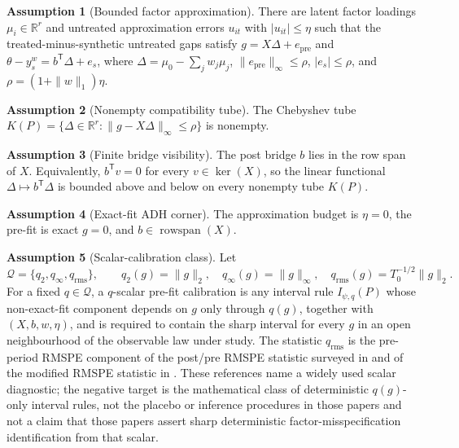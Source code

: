 \documentclass[11pt]{article}
\newcommand{\transpose}{\mathsf{T}}
\newcommand{\R}{\mathbb{R}}
\theoremstyle{definition}
\newtheorem{assumption}{Assumption}
\theoremstyle{plain}
\theoremstyle{remark}
\begin{document}
\begin{assumption}[Bounded factor approximation]\label{ass:bounded-factor}
There are latent factor loadings \(\mu_i\in\R^r\) and untreated approximation
errors \(u_{it}\) with \(|u_{it}|\le\eta\) such that the treated-minus-synthetic
untreated gaps satisfy \(g=X\Delta+e_{\mathrm{pre}}\) and
\(\theta-y_s^w=b^\transpose\Delta+e_s\), where
\(\Delta=\mu_0-\sum_jw_j\mu_j\), \(\|e_{\mathrm{pre}}\|_\infty\le\rho\),
\(|e_s|\le\rho\), and \(\rho=(1+\|w\|_1)\eta\).
\end{assumption}

\begin{assumption}[Nonempty compatibility tube]\label{ass:nonempty}
The Chebyshev tube \(K(P)=\{\Delta\in\R^r:\|g-X\Delta\|_\infty\le\rho\}\) is
nonempty.
\end{assumption}

\begin{assumption}[Finite bridge visibility]\label{ass:bridge-visible}
The post bridge \(b\) lies in the row span of \(X\).  Equivalently,
\(b^\transpose v=0\) for every \(v\in\ker(X)\), so the linear functional
\(\Delta\mapsto b^\transpose\Delta\) is bounded above and below on every
nonempty tube \(K(P)\).
\end{assumption}

\begin{assumption}[Exact-fit ADH corner]\label{ass:exact-corner}
The approximation budget is \(\eta=0\), the pre-fit is exact \(g=0\), and
\(b\in\operatorname{rowspan}(X)\).
\end{assumption}

\begin{assumption}[Scalar-calibration class]\label{ass:scalar-class}
Let
\[
 \mathcal Q=\{q_2,q_\infty,q_{\mathrm{rms}}\},\qquad
 q_2(g)=\|g\|_2,\quad q_\infty(g)=\|g\|_\infty,\quad
 q_{\mathrm{rms}}(g)=T_0^{-1/2}\|g\|_2 .
\]
For a fixed \(q\in\mathcal Q\), a \(q\)-scalar pre-fit calibration is any
interval rule \(I_{\psi,q}(P)\) whose non-exact-fit component depends on \(g\)
only through \(q(g)\), together with \((X,b,w,\eta)\), and is required to
contain the sharp interval for every \(g\) in an open neighbourhood of the
observable law under study.  The statistic \(q_{\mathrm{rms}}\) is the
pre-period RMSPE component of the post/pre RMSPE statistic surveyed in
\cite{Abadie2021} and of the modified RMSPE statistic in
\cite{FirpoPossebom2018}.  These references name a widely used scalar
diagnostic; the negative target is the mathematical class of deterministic
\(q(g)\)-only interval rules, not the placebo or inference procedures in those
papers and not a claim that those papers assert sharp deterministic
factor-misspecification identification from that scalar.
\end{assumption}
\end{document}
